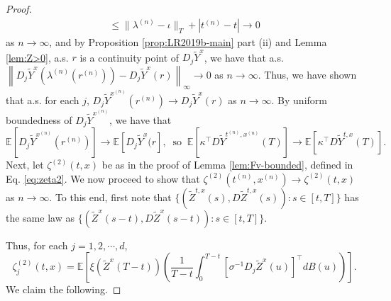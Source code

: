 \documentclass[11pt]{article}
\theoremstyle{definition}
\theoremstyle{plain}
\newcommand{\E}{\mathbb{E}}
\begin{document}
\begin{appendices}
\begin{proof}
\begin{align*}
\le \|\lambda^{(n)} - \iota\|_T + |t^{(n)} - t| \to 0
\end{align*}
as $n \to \infty$, and by Proposition \ref{prop:LR2019b-main} part (ii) and Lemma \ref{lem:Z>0}, a.s. $r$ is a continuity point of $D_j\tilde Y^{x}$, 
we have that a.s. $\left\|D_j\tilde Y^{x}(\lambda^{(n)}(r^{(n)})) - D_j\tilde Y^{x}(r)\right\|_\infty \to 0$ as $n \to \infty$. 
Thus, we have shown that a.s. for each $j$, $D_j\tilde Y^{x^{(n)}}(r^{(n)}) \to D_j\tilde Y^{x}(r)$ as $n \to \infty$. 
By uniform boundedness of $D_j\tilde Y^{x^{(n)}}$, we have that
\[
\E\left[D_j\tilde Y^{x^{(n)}}(r^{(n)})\right] \to \E\left[D_j\tilde Y^{x}(r\right], \ \text{ so } \
\E\left[\kappa^{\top} D\tilde Y^{t^{(n)}, x^{(n)}}(T)\right] \to \E\left[\kappa^{\top} D\tilde Y^{t,x}(T)\right].
\]
Next, let \( \zeta^{(2)}(t,x) \) be as in the proof of Lemma \ref{lem:Fv-bounded}, defined in Eq. \eqref{eq:zeta2}. 
We now proceed to show that \( \zeta^{(2)}(t^{(n)}, x^{(n)}) \to \zeta^{(2)}(t,x) \)  
as \( n \to \infty \).
To this end, first note that $\{ (\tilde{Z}^{t,x}(s), D \tilde{Z}^{t,x}(s)) : s \in [t, T] \}$ 
has the same law as $\{ (\tilde{Z}^{x}(s - t), D \tilde{Z}^x(s - t)) : s \in [t, T] \}$.

Thus, for each $j = 1, 2, \cdots, d$, 
\[
\zeta^{(2)}_j(t,x) = \mathbb{E} \left[ \xi(\tilde{Z}^x(T - t)) 
\left( \frac{1}{T - t} \int_0^{T - t} \left[\sigma^{-1} D_j \tilde{Z}^x(u)\right]^{\top} dB(u) \right) \right].
\]
We claim the following. 


\end{proof}
\end{appendices}
\end{document}
